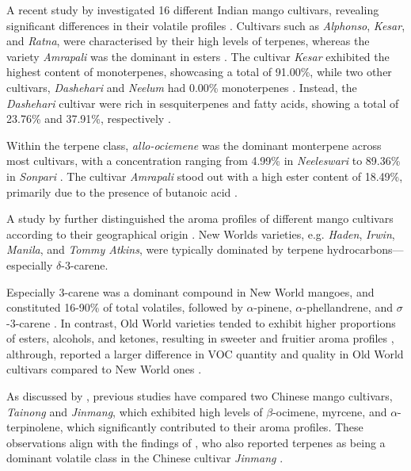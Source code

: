 \vspace{1em}
A recent study by \textcite{A16_Tandel2023} investigated 16 different Indian mango cultivars, revealing significant differences in their volatile profiles \cite*{A16_Tandel2023}. Cultivars such as \textit{Alphonso}, \textit{Kesar}, and \textit{Ratna}, were characterised by their high levels of terpenes, whereas the variety \textit{Amrapali} was the dominant in esters \cite*{A16_Tandel2023}. The cultivar \textit{Kesar} exhibited the highest content of monoterpenes, showcasing a total of 91.00\%, while two other cultivars, \textit{Dashehari} and \textit{Neelum} had 0.00\% monoterpenes \cite*{A16_Tandel2023}. Instead, the \textit{Dashehari} cultivar were rich in sesquiterpenes and fatty acids, showing a total of 23.76\% and 37.91\%, respectively \cite*{A16_Tandel2023}.

Within the terpene class, \textit{allo-ociemene} was the dominant monterpene across most cultivars, with a concentration ranging from 4.99\% in \textit{Neeleswari} to 89.36\% in \textit{Sonpari} \cite*{A16_Tandel2023}. The cultivar \textit{Amrapali} stood out with a high ester content of 18.49\%, primarily due to the presence of butanoic acid \cite*{A16_Tandel2023}.

\vspace{1em}
A study by \textcite{A13_ElHadi2013} further distinguished the aroma profiles of different mango cultivars according to their geographical origin \cite*{A13_ElHadi2013}. New Worlds varieties, e.g. \textit{Haden}, \textit{Irwin}, \textit{Manila}, and \textit{Tommy Atkins}, were typically dominated by terpene hydrocarbons—especially $\delta$-3-carene. 

Especially 3-carene was a dominant compound in New World mangoes, and constituted 16-90\% of total volatiles, followed by  $\alpha$-pinene, $\alpha$-phellandrene, and $\sigma$-3-carene \cite*{A13_ElHadi2013}. In contrast, Old World varieties tended to exhibit higher proportions of esters, alcohols, and ketones, resulting in sweeter and fruitier aroma profiles \cite*{A13_ElHadi2013}, althrough, \textcite{A13_ElHadi2013} reported a larger difference in VOC quantity and quality in Old World cultivars compared to New World ones \cite*{A13_ElHadi2013}. 

\vspace{1em}
As discussed by \textcite{A16_Tandel2023}, previous studies have compared two Chinese mango cultivars, \textit{Tainong} and \textit{Jinmang}, which exhibited high levels of $\beta$-ocimene, myrcene, and $\alpha$-terpinolene, which significantly contributed to their aroma profiles. These observations align with the findings of \textcite{A15_Xie2023}, who also reported terpenes as being a dominant volatile class in the Chinese cultivar \textit{Jinmang} \cite*{A16_Tandel2023, A15_Xie2023}.


